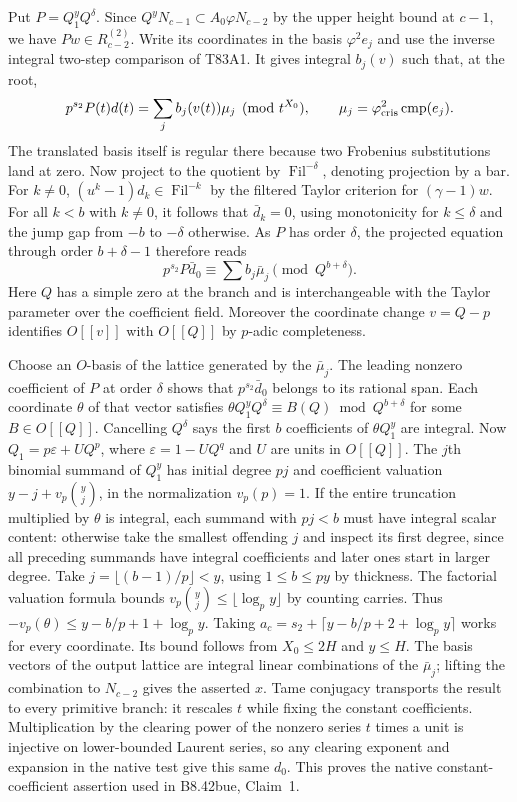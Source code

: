 Put $P=Q_1^yQ^\delta$. Since $Q^yN_{c-1}\subset
A_0\varphi N_{c-2}$ by the upper height bound at $c-1$, we
have $Pw\in R_{c-2}^{(2)}$. Write its coordinates in the basis
$\varphi^2 e_j$ and use the inverse integral two-step comparison
of T83A1. It gives integral $b_j(v)$ such that, at the root,
\[
 p^{s_2}P(t)d(t)=\sum_j b_j(v(t))\mu_j\pmod{t^{X_0}},
 \qquad \mu_j=\varphi_{\rm cris}^2\operatorname{cmp}(e_j).
\]
The translated basis itself is regular there because two Frobenius
substitutions land at zero. Now project to the quotient by
$\operatorname{Fil}^{-\delta}$, denoting projection by a bar.
For $k\ne0$, $(u^k-1)d_k\in\operatorname{Fil}^{-k}$ by the
filtered Taylor criterion for $(\gamma-1)w$. For all $k<b$ with
$k\ne0$, it follows that $\bar d_k=0$, using monotonicity for
$k\le\delta$ and the jump gap from $-b$ to $-\delta$ otherwise.
As $P$ has order $\delta$, the projected equation through order
$b+\delta-1$ therefore reads
\[
 p^{s_2}P\bar d_0\equiv\sum b_j\bar\mu_j\pmod{Q^{b+\delta}}.
\]
Here $Q$ has a simple zero at the branch and is interchangeable
with the Taylor parameter over the coefficient field. Moreover the
coordinate change $v=Q-p$ identifies $O[[v]]$ with $O[[Q]]$ by
$p$-adic completeness.

Choose an $O$-basis of the lattice generated by the $\bar\mu_j$.
The leading nonzero coefficient of $P$ at order $\delta$ shows
that $p^{s_2}\bar d_0$ belongs to its rational span. Each
coordinate $\theta$ of that vector satisfies
$\theta Q_1^y Q^\delta\equiv B(Q)\bmod Q^{b+\delta}$
for some $B\in O[[Q]]$. Cancelling $Q^\delta$ says the first
$b$ coefficients of $\theta Q_1^y$ are integral. Now
$Q_1=p\varepsilon+UQ^p$, where $\varepsilon=1-UQ^q$
and $U$ are units in $O[[Q]]$. The $j$th binomial summand of
$Q_1^y$ has initial degree $pj$ and coefficient valuation
$y-j+v_p\binom yj$, in the normalization $v_p(p)=1$.
If the entire truncation multiplied by $\theta$ is integral, each
summand with $pj<b$ must have integral scalar content: otherwise
take the smallest offending $j$ and inspect its first degree, since
all preceding summands have integral coefficients and later ones
start in larger degree. Take $j=\lfloor(b-1)/p\rfloor<y$,
using $1\le b\le py$ by thickness. The factorial valuation formula
bounds $v_p\binom yj\le\lfloor\log_p y\rfloor$ by counting
carries. Thus $-v_p(\theta)\le y-b/p+1+\log_p y$.
Taking $a_c=s_2+\lceil y-b/p+2+\log_p y\rceil$ works for
every coordinate. Its bound follows from $X_0\le2H$ and
$y\le H$. The basis vectors of the output lattice are integral
linear combinations of the $\bar\mu_j$; lifting the combination
to $N_{c-2}$ gives the asserted $x$. Tame conjugacy transports
the result to every primitive branch: it rescales $t$ while fixing
the constant coefficients. Multiplication by the clearing power of the nonzero series
$t$ times a unit is injective on lower-bounded Laurent series, so
any clearing exponent and expansion in the native test give this
same $d_0$. This proves the native constant-coefficient
assertion used in B8.42bue, Claim~1.

